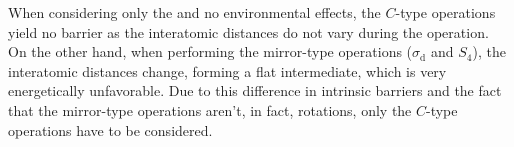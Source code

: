 When considering only the  and no environmental effects, the $C$-type operations yield no barrier as the interatomic distances do not vary during the operation.
On the other hand, when performing the mirror-type operations ($\sigma_\text{d}$ and $S_4$), the interatomic distances change, forming a flat  intermediate, which is very energetically unfavorable.
Due to this difference in intrinsic barriers and the fact that the mirror-type operations aren't, in fact, rotations, only the $C$-type operations have to be considered.


